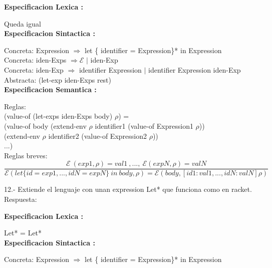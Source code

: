 \documentclass{article}
\begin{document}
\textbf{Especificacion Lexica :} \newline

Queda igual \\

\textbf{Especificacion Sintactica :} \newline


Concreta: Expression $\Rightarrow$ let \{ identifier = Expression\}* in Expression \\

Concreta: iden-Exps  $\Rightarrow \mathcal{E}$ $|$ iden-Exp \\

Concreta: iden-Exp $\Rightarrow$ identifier Expression $|$ identifier Expression iden-Exp \\

Abstracta: (let-exp iden-Exps rest) \\


\textbf{Especificacion Semantica :} \newline

Reglas: \\

(value-of (let-exps iden-Exps body) $\rho$) = \\ 
  (value-of body (extend-env $\rho$ identifier1 (value-of Expression1 $\rho$)) \\
                  (extend-env $\rho$ identifier2 (value-of Expression2 $\rho$)) \\
                  ...) \\


Reglas breves: \\

$$
\frac{\mathcal{E} \: (exp1,\rho)=val1 \:,...,\: \mathcal{E} (expN,\rho)=valN}{\mathcal{E}(let \{ id = exp1,...,idN = expN \} \: in \: body, \rho) = \mathcal{E}(body, [id1 : val1,..., idN : valN]\rho)}
$$



12.- Extiende el lenguaje con unan expression Let* que funciona como en racket.\newline
Respuesta: \newline

\textbf{Especificacion Lexica :} \newline

Let* = Let* \\

\textbf{Especificacion Sintactica :} \newline

Concreta: Expression $\Rightarrow$ let \{ identifier = Expression\}* in Expression \\
\end{document}
